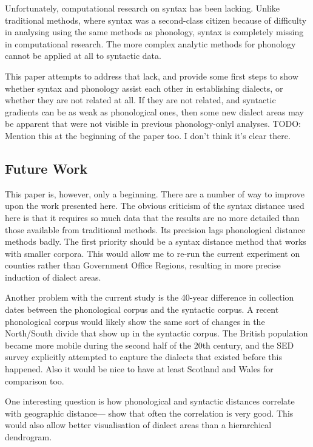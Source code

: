\documentclass[11pt]{article}
\begin{document}
Unfortunately, computational research on syntax has been
lacking. Unlike traditional methods, where syntax was a second-class
citizen because of difficulty in analysing using the same methods as
phonology, syntax is completely missing in computational
research. The more complex analytic methods for phonology cannot be applied at all
to syntactic data.

This paper attempts to address that lack, and provide some first steps
to show whether syntax and phonology assist each other in establishing
dialects, or whether they are not related at all. If they are not
related, and syntactic gradients can be as weak as phonological ones,
then some new dialect areas may be apparent that were not visible in
previous phonology-onlyl analyses.
TODO: Mention this at the beginning of the paper too. I don't think
it's clear there.

\subsection{Future Work}

This paper is, however, only a beginning. There are a number of way to
improve upon the work presented here. The obvious criticism of the
syntax distance used here is that it requires so much data that the
results are no more detailed than those available from traditional
methods. Its precision lags phonological distance methods badly. The
first priority should be a syntax distance method that works with
smaller corpora. This would allow me to re-run the current experiment
on counties rather than Government Office Regions, resulting in more
precise induction of dialect areas.

Another problem with the current study is the 40-year difference in
collection dates between the phonological corpus and the syntactic
corpus. A recent phonological corpus would likely show the same sort
of changes in the North/South divide that show up in the syntactic
corpus. The British population became more mobile during the second
half of the 20th century, and the SED survey explicitly attempted to capture
the dialects that existed before this happened. Also it would be nice to have at
least Scotland and Wales for comparison too.

One interesting question is
how phonological and syntactic distances correlate with geographic
distance--- show that often the correlation is
very good. This would also allow better visualisation of dialect areas
than a hierarchical dendrogram.
\end{document}
